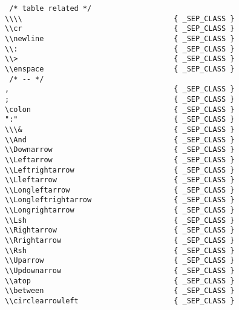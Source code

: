 \begin{verbatim}
 /* table related */                              
\\\\                                   { _SEP_CLASS }
\\cr                                   { _SEP_CLASS }
\\newline                              { _SEP_CLASS }
\\:                                    { _SEP_CLASS }
\\>                                    { _SEP_CLASS }
\\enspace                              { _SEP_CLASS }
 /* -- */                              
,                                      { _SEP_CLASS }
;                                      { _SEP_CLASS }
\colon                                 { _SEP_CLASS }
":"                                    { _SEP_CLASS }
\\\&                                   { _SEP_CLASS }
\\And                                  { _SEP_CLASS }
\\Downarrow                            { _SEP_CLASS }
\\Leftarrow                            { _SEP_CLASS }
\\Leftrightarrow                       { _SEP_CLASS }
\\Lleftarrow                           { _SEP_CLASS }
\\Longleftarrow                        { _SEP_CLASS }
\\Longleftrightarrow                   { _SEP_CLASS }
\\Longrightarrow                       { _SEP_CLASS }
\\Lsh                                  { _SEP_CLASS }
\\Rightarrow                           { _SEP_CLASS }
\\Rrightarrow                          { _SEP_CLASS }
\\Rsh                                  { _SEP_CLASS }
\\Uparrow                              { _SEP_CLASS }
\\Updownarrow                          { _SEP_CLASS }
\\atop                                 { _SEP_CLASS }
\\between                              { _SEP_CLASS }
\\circlearrowleft                      { _SEP_CLASS }

\end{verbatim}
